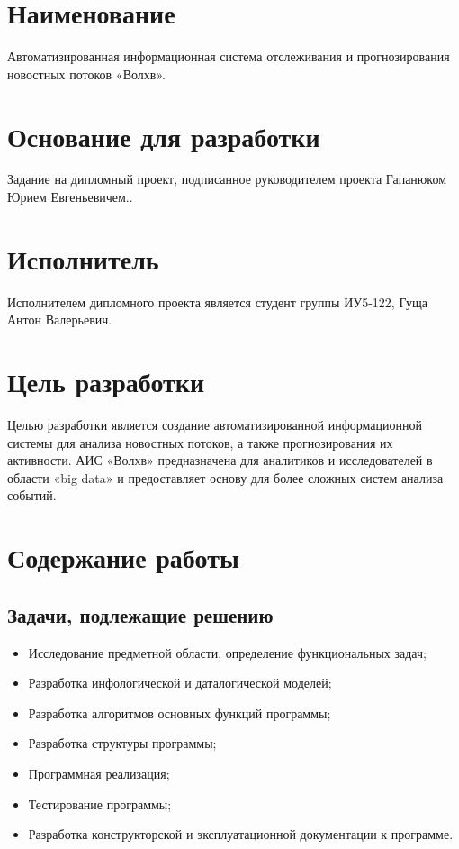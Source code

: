 \documentclass[russian,utf8,emptystyle]{eskdtext}
\newcounter{pageaux}
\begin{document}

\setcounter{pageaux}{1}
\setcounter{page}{158}
\tableofcontents

\clearpage  
\section{Наименование}

Автоматизированная информационная система отслеживания и прогнозирования новостных потоков «Волхв».

\section{Основание для разработки}
Задание на дипломный проект, подписанное руководителем проекта Гапанюком Юрием Евгеньевичем..

\section{Исполнитель}

Исполнителем дипломного проекта является студент группы ИУ5-122, Гуща Антон Валерьевич.

\section{Цель разработки}

Целью разработки является создание автоматизированной информационной системы для анализа новостных потоков, а также прогнозирования их активности. АИС «Волхв» предназначена для аналитиков и исследователей в области «big data» и предоставляет основу для более сложных систем анализа событий.

\section{Содержание работы}

\subsection{Задачи, подлежащие решению}
\begin{itemize}
\item Исследование предметной области, определение функциональных задач;
\item Разработка инфологической и даталогической моделей;
\item Разработка алгоритмов основных функций программы;
\item Разработка структуры программы;
\item Программная реализация;
\item Тестирование программы;
\item Разработка конструкторской и эксплуатационной документации к программе.
\end{itemize}
\end{document}
